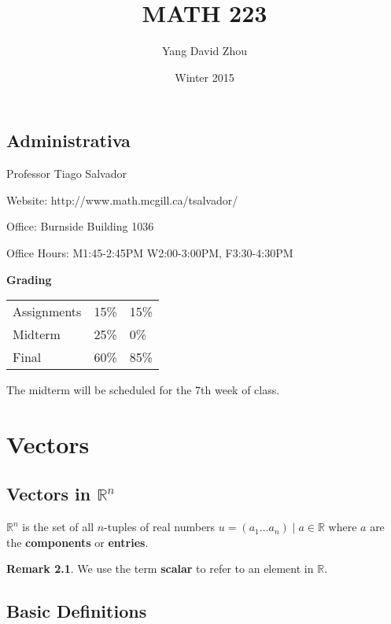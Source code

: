 \documentclass{report}
\theoremstyle{definition}
\newtheorem{_rem}{Remark}
\begin{document}
 
\title{MATH 223} 
\author{Yang David Zhou}
\date{Winter 2015}
\maketitle

\section{Administrativa}

\raggedright

Professor Tiago Salvador \newline

Website: http://www.math.mcgill.ca/tsalvador/ \newline

Office: Burnside Building 1036

Office Hours: M1:45-2:45PM W2:00-3:00PM, F3:30-4:30PM \newline

\textbf{Grading}

\begin{tabular}{ l l l }
  Assignments & 15\% & 15\% \\
  Midterm     & 25\% &  0\% \\
  Final       & 60\% & 85\% \\
\end{tabular} \newline

The midterm will be scheduled for the 7th week of class.

\chapter{Vectors}

\section[Vectors in Rn]{Vectors in \(\mathbb{R}^n\)}

\(\mathbb{R}^n\) is the set of all \(n\)-tuples of real numbers \(u=(a_1 ... a_n) \mid a\in \mathbb{R}\) where \(a\) are the \textbf{components} or \textbf{entries}.

\begin{_rem}
We use the term \textbf{scalar} to refer to an element in \(\mathbb{R}\).
\end{_rem}

\section{Basic Definitions}
\end{document}
